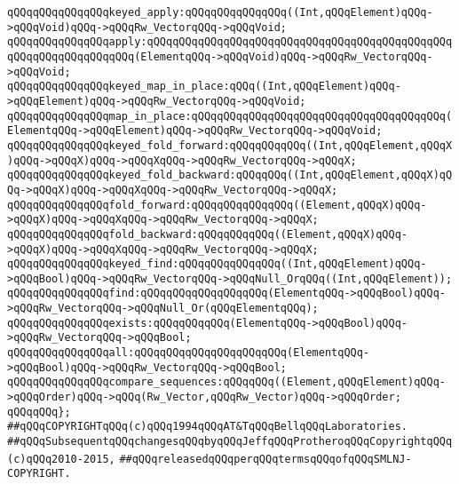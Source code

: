 \verb|qQQqqQQqqQQqqQQqkeyed_apply:qQQqqQQqqQQqqQQq((Int,qQQqElement)qQQq->qQQqVoid)qQQq->qQQqRw_VectorqQQq->qQQqVoid;|\newline
\verb|qQQqqQQqqQQqqQQqapply:qQQqqQQqqQQqqQQqqQQqqQQqqQQqqQQqqQQqqQQqqQQqqQQqqQQqqQQqqQQqqQQqqQQq(ElementqQQq->qQQqVoid)qQQq->qQQqRw_VectorqQQq->qQQqVoid;|\newline
\newline
\verb|qQQqqQQqqQQqqQQqkeyed_map_in_place:qQQq((Int,qQQqElement)qQQq->qQQqElement)qQQq->qQQqRw_VectorqQQq->qQQqVoid;|\newline
\verb|qQQqqQQqqQQqqQQqmap_in_place:qQQqqQQqqQQqqQQqqQQqqQQqqQQqqQQqqQQqqQQq(ElementqQQq->qQQqElement)qQQq->qQQqRw_VectorqQQq->qQQqVoid;|\newline
\newline
\verb|qQQqqQQqqQQqqQQqkeyed_fold_forward:qQQqqQQqqQQq((Int,qQQqElement,qQQqX)qQQq->qQQqX)qQQq->qQQqXqQQq->qQQqRw_VectorqQQq->qQQqX;|\newline
\verb|qQQqqQQqqQQqqQQqkeyed_fold_backward:qQQqqQQq((Int,qQQqElement,qQQqX)qQQq->qQQqX)qQQq->qQQqXqQQq->qQQqRw_VectorqQQq->qQQqX;|\newline
\newline
\verb|qQQqqQQqqQQqqQQqfold_forward:qQQqqQQqqQQqqQQq((Element,qQQqX)qQQq->qQQqX)qQQq->qQQqXqQQq->qQQqRw_VectorqQQq->qQQqX;|\newline
\verb|qQQqqQQqqQQqqQQqfold_backward:qQQqqQQqqQQq((Element,qQQqX)qQQq->qQQqX)qQQq->qQQqXqQQq->qQQqRw_VectorqQQq->qQQqX;|\newline
\newline
\verb|qQQqqQQqqQQqqQQqkeyed_find:qQQqqQQqqQQqqQQq((Int,qQQqElement)qQQq->qQQqBool)qQQq->qQQqRw_VectorqQQq->qQQqNull_OrqQQq((Int,qQQqElement));|\newline
\verb|qQQqqQQqqQQqqQQqfind:qQQqqQQqqQQqqQQqqQQq(ElementqQQq->qQQqBool)qQQq->qQQqRw_VectorqQQq->qQQqNull_Or(qQQqElementqQQq);|\newline
\newline
\verb|qQQqqQQqqQQqqQQqexists:qQQqqQQqqQQq(ElementqQQq->qQQqBool)qQQq->qQQqRw_VectorqQQq->qQQqBool;|\newline
\verb|qQQqqQQqqQQqqQQqall:qQQqqQQqqQQqqQQqqQQqqQQq(ElementqQQq->qQQqBool)qQQq->qQQqRw_VectorqQQq->qQQqBool;|\newline
\newline
\verb|qQQqqQQqqQQqqQQqcompare_sequences:qQQqqQQq((Element,qQQqElement)qQQq->qQQqOrder)qQQq->qQQq(Rw_Vector,qQQqRw_Vector)qQQq->qQQqOrder;|\newline
\verb|qQQqqQQq};|\newline
\newline
\newline
\verb|##qQQqCOPYRIGHTqQQq(c)qQQq1994qQQqAT&TqQQqBellqQQqLaboratories.|\newline
\verb|##qQQqSubsequentqQQqchangesqQQqbyqQQqJeffqQQqProtheroqQQqCopyrightqQQq(c)qQQq2010-2015,|\newline
\verb|##qQQqreleasedqQQqperqQQqtermsqQQqofqQQqSMLNJ-COPYRIGHT.|\newline

